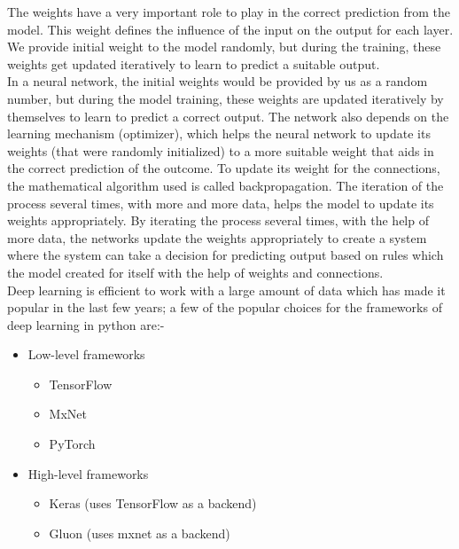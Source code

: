  The weights have a very important role to play in the correct prediction from the model. This weight defines the influence of the input on the output for each layer. We provide initial weight to the model randomly, but during the training, these weights get updated iteratively to learn to predict a suitable output.\\
 In a neural network, the initial weights would be provided by us as a random number, but during the model training, these weights are updated iteratively by themselves to learn to predict a correct output. The network also depends on the learning mechanism (optimizer), which helps the neural network to update its weights (that were randomly initialized) to a more suitable weight that aids in the correct prediction of the outcome.  To update its weight for the connections, the mathematical algorithm used is called backpropagation. The iteration of the process several times, with more and more data, helps the model to update its weights appropriately. By iterating the process several times, with the help of more data, the networks update the weights appropriately to create a system where the system can take a decision for predicting output based on rules which the model created for itself with the help of weights and connections\cite{22-23}.\\


Deep learning is efficient to work with a large amount of data which has made it popular in the last few years; a few of the popular choices for the frameworks of deep learning in python are:-\\
 \begin{itemize}
     \item Low-level frameworks 
         \begin{itemize}
             \item TensorFlow
             \item MxNet
             \item PyTorch
         \end{itemize}
      \item High-level frameworks
         \begin{itemize}
             \item Keras (uses TensorFlow as a backend)
              \item Gluon (uses mxnet as a backend)
         \end{itemize}
 \end{itemize}

